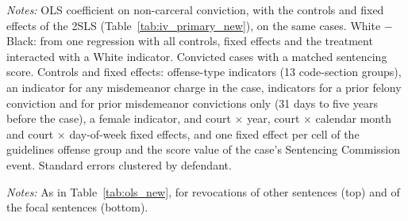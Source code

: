 \documentclass[11pt]{article}
\newcommand{\tabnote}[1]{\par\vspace{0.6ex}\begin{minipage}{\linewidth}\linespread{1}\footnotesize\textit{Notes:} #1\end{minipage}}
\newcommand{\controlsnote}{offense-type indicators (13 code-section groups), an indicator for any misdemeanor charge in the case, indicators for a prior felony conviction and for prior misdemeanor convictions only (31 days to five years before the case), a female indicator, and court $\times$ year, court $\times$ calendar month and court $\times$ day-of-week fixed effects}
\newcommand{\specnoteprim}{Convicted cases with a matched sentencing score. Controls and fixed effects: \controlsnote, and one fixed effect per cell of the guidelines offense group and the score value of the case's Sentencing Commission event. Standard errors clustered by defendant.}
\begin{document}
\begin{table}[H]
\centering
\caption{OLS from the disposition: new felony cases}\label{tab:ols_new}
{\small\linespread{1}\selectfont\renewcommand{\arraystretch}{0.9}}
\tabnote{OLS coefficient on non-carceral conviction, with the controls and fixed effects of the 2SLS (Table~\ref{tab:iv_primary_new}), on the same cases. White $-$ Black: from one regression with all controls, fixed effects and the treatment interacted with a White indicator. \specnoteprim}
\end{table}

\begin{table}[H]
\centering
\caption{OLS from the disposition: revocations}\label{tab:ols_rev}
{\small\linespread{1}\selectfont\renewcommand{\arraystretch}{0.9}}\par\medskip
{\small\linespread{1}\selectfont\renewcommand{\arraystretch}{0.9}}
\tabnote{As in Table~\ref{tab:ols_new}, for revocations of other sentences (top) and of the focal sentences (bottom).}
\end{table}
\end{document}
